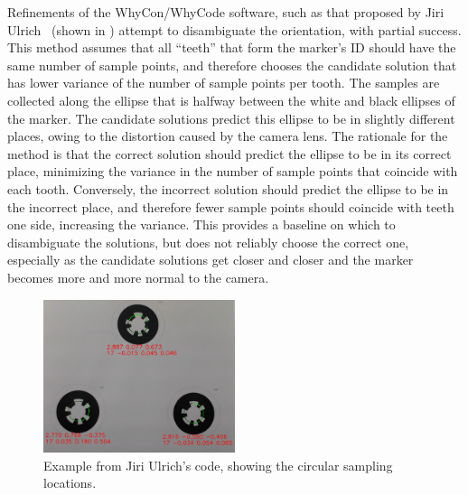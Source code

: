 Refinements of the WhyCon/WhyCode software, such as that proposed by Jiri Ulrich~\cite{julrich_whycon} (shown in ) attempt to disambiguate
the orientation, with partial success.
This method assumes that all ``teeth'' that form the marker's ID should have the same number of sample points,
and therefore chooses the candidate solution that has lower variance of the number of sample points per tooth.
The samples are collected along the ellipse that is halfway between the white and black ellipses of the marker.
The candidate solutions predict this ellipse to be in slightly different places,
owing to the distortion caused by the camera lens.
The rationale for the method is that the correct solution should predict the ellipse to be in its correct place,
minimizing the variance in the number of sample points that coincide with each tooth.
Conversely, the incorrect solution should predict the ellipse to be in the incorrect place,
and therefore fewer sample points should coincide with teeth one side, increasing the variance.
This provides a baseline on which to disambiguate the solutions, but does not reliably choose the correct one,
especially as the candidate solutions get closer and closer and the marker becomes more and more normal to the camera.

\begin{figure}
    \centering
    \includegraphics[width=0.5\textwidth]{images/cropped_whycode_3_8_jiri_example}
    \caption{Example from Jiri Ulrich's code, showing the circular sampling locations.}
    \label{figure:jiri_whycode}
\end{figure}

